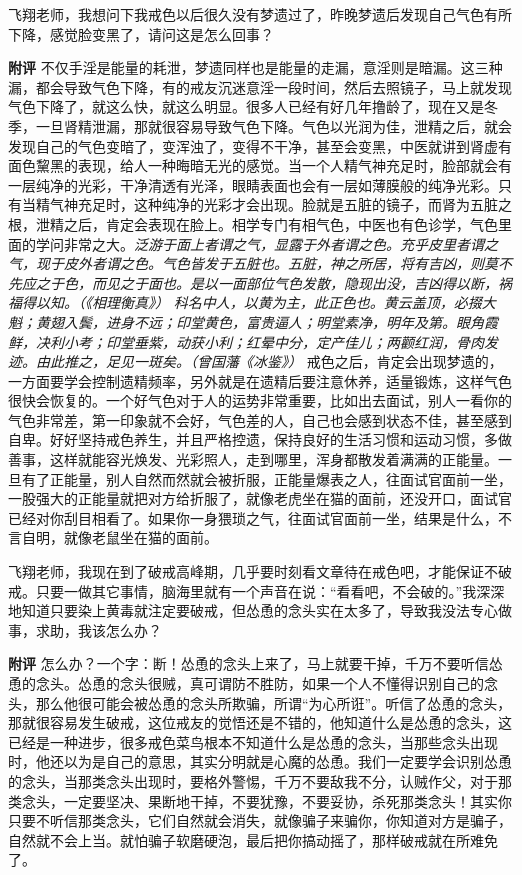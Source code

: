 \begin{case}
    飞翔老师，我想问下我戒色以后很久没有梦遗过了，昨晚梦遗后发现自己气色有所下降，感觉脸变黑了，请问这是怎么回事？

    \textbf{附评} 不仅手淫是能量的耗泄，梦遗同样也是能量的走漏，意淫则是暗漏。这三种漏，都会导致气色下降，有的戒友沉迷意淫一段时间，然后去照镜子，马上就发现气色下降了，就这么快，就这么明显。很多人已经有好几年撸龄了，现在又是冬季，一旦肾精泄漏，那就很容易导致气色下降。气色以光润为佳，泄精之后，就会发现自己的气色变暗了，变浑浊了，变得不干净，甚至会变黑，中医就讲到肾虚有面色黧黑的表现，给人一种晦暗无光的感觉。当一个人精气神充足时，脸部就会有一层纯净的光彩，干净清透有光泽，眼睛表面也会有一层如薄膜般的纯净光彩。只有当精气神充足时，这种纯净的光彩才会出现。脸就是五脏的镜子，而肾为五脏之根，泄精之后，肯定会表现在脸上。相学专门有相气色，中医也有色诊学，气色里面的学问非常之大。\textit{泛游于面上者谓之气，显露于外者谓之色。充乎皮里者谓之气，现于皮外者谓之色。气色皆发于五脏也。五脏，神之所居，将有吉凶，则莫不先应之于色，而见之于面也。是以一面部位气色发散，隐现出没，吉凶得以断，祸福得以知。（《相理衡真》）} \textit{科名中人，以黄为主，此正色也。黄云盖顶，必掇大魁；黄翅入鬓，进身不远；印堂黄色，富贵逼人；明堂素净，明年及第。眼角霞鲜，决利小考；印堂垂紫，动获小利；红晕中分，定产佳儿；两颧红润，骨肉发迹。由此推之，足见一斑矣。（曾国藩《冰鉴》）} 戒色之后，肯定会出现梦遗的，一方面要学会控制遗精频率，另外就是在遗精后要注意休养，适量锻炼，这样气色很快会恢复的。一个好气色对于人的运势非常重要，比如出去面试，别人一看你的气色非常差，第一印象就不会好，气色差的人，自己也会感到状态不佳，甚至感到自卑。好好坚持戒色养生，并且严格控遗，保持良好的生活习惯和运动习惯，多做善事，这样就能容光焕发、光彩照人，走到哪里，浑身都散发着满满的正能量。一旦有了正能量，别人自然而然就会被折服，正能量爆表之人，往面试官面前一坐，一股强大的正能量就把对方给折服了，就像老虎坐在猫的面前，还没开口，面试官已经对你刮目相看了。如果你一身猥琐之气，往面试官面前一坐，结果是什么，不言自明，就像老鼠坐在猫的面前。
\end{case}

\begin{case}
    飞翔老师，我现在到了破戒高峰期，几乎要时刻看文章待在戒色吧，才能保证不破戒。只要一做其它事情，脑海里就有一个声音在说：“看看吧，不会破的。”我深深地知道只要染上黄毒就注定要破戒，但怂恿的念头实在太多了，导致我没法专心做事，求助，我该怎么办？

    \textbf{附评} 怎么办？一个字：断！怂恿的念头上来了，马上就要干掉，千万不要听信怂恿的念头。怂恿的念头很贼，真可谓防不胜防，如果一个人不懂得识别自己的念头，那么他很可能会被怂恿的念头所欺骗，所谓“为心所诳”。听信了怂恿的念头，那就很容易发生破戒，这位戒友的觉悟还是不错的，他知道什么是怂恿的念头，这已经是一种进步，很多戒色菜鸟根本不知道什么是怂恿的念头，当那些念头出现时，他还以为是自己的意思，其实分明就是心魔的怂恿。我们一定要学会识别怂恿的念头，当那类念头出现时，要格外警惕，千万不要敌我不分，认贼作父，对于那类念头，一定要坚决、果断地干掉，不要犹豫，不要妥协，杀死那类念头！其实你只要不听信那类念头，它们自然就会消失，就像骗子来骗你，你知道对方是骗子，自然就不会上当。就怕骗子软磨硬泡，最后把你搞动摇了，那样破戒就在所难免了。
\end{case}

